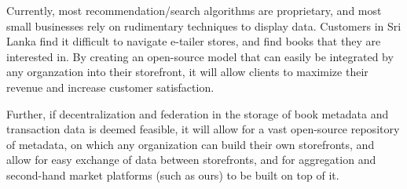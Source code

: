 \begin{enumerate}
  Currently, most recommendation/search algorithms are proprietary, and most small
  businesses rely on rudimentary techniques to display data. Customers in Sri Lanka
  find it difficult to navigate e-tailer stores, and find books that they are interested
  in. By creating an open-source model that can easily be integrated by any organzation
  into their storefront, it will allow clients to maximize their revenue and increase
  customer satisfaction.

  Further, if decentralization and federation in the storage of book metadata and transaction
  data is deemed feasible, it will allow for a vast open-source repository of metadata, on
  which any organization can build their own storefronts, and allow for easy exchange of
  data between storefronts, and for aggregation and second-hand market platforms (such as ours)
  to be built on top of it.

  
\end{enumerate}
